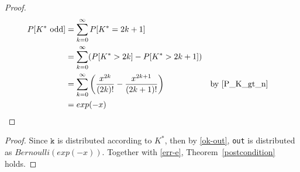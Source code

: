 \documentclass{article}
\begin{document}
\begin{proof} 
    \begin{align*} 
        P[K^{*} \text{ odd}] &= \sum_{k=0}^\infty P[K^{*} = 2k + 1] \\ 
        &= \sum_{k=0}^\infty (P[K^{*} > 2k] - P[K^{*} > 2k + 1]) \\ 
        &= \sum_{k=0}^\infty \left(\frac{x^{2k}}{(2k)!} - \frac{x^{2k + 1}}{(2k + 1)!}\right) && \text{by } \ref{P_K_gt_n} \\ 
        &= exp(-x) 
    \end{align*} 
 
\end{proof} 
 
\begin{proof} 
    Since $\mathtt{k}$ is distributed according to $K^{*}$, then by \ref{ok-out}, \texttt{out} is distributed as $Bernoulli(exp(-x))$. 
    Together with \ref{err-e}, Theorem~\ref{postcondition} holds.
\end{proof} 
 
 
 
\end{document}
